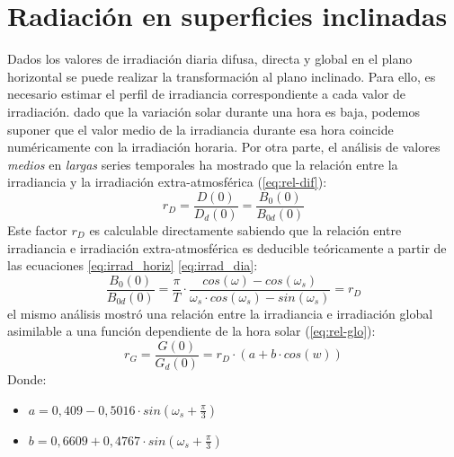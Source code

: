\section{Radiación en superficies inclinadas}
\label{sec:orgcf3b064}
\label{sec:radiacion-superficies-inclinadas}
Dados los valores de irradiación diaria difusa, directa y global en el plano horizontal se puede realizar la transformación al plano inclinado. Para ello, es necesario estimar el perfil de irradiancia correspondiente a cada valor de irradiación. dado que la variación solar durante una hora es baja, podemos suponer que el valor medio de la irradiancia durante esa hora coincide numéricamente con la irradiación horaria. Por otra parte, el análisis de valores \emph{medios}  en \emph{largas} series temporales ha mostrado que la relación entre la irradiancia y la irradiación extra-atmosférica \cite{Collares-Pereira.Rabl1979} (\ref{eq:rel-dif}):
\begin{equation}
r_D=\frac{D(0)}{D_d(0)}=\frac{B_0(0)}{B_{0d}(0)}
\label{eq:rel-dif}
\end{equation}
Este factor \(r_D\) es calculable directamente sabiendo que la relación entre irradiancia e irradiación extra-atmosférica es deducible teóricamente a partir de las ecuaciones \ref{eq:irrad_horiz} \ref{eq:irrad_dia}:
\begin{equation}
\frac{B_0(0)}{B_{0d}(0)}=\frac{\pi}{T}\cdot \frac{cos(\omega)-cos(\omega_s)}{\omega_s\cdot cos(\omega_s)-sin(\omega_s)}=r_D
\label{eq:rel-dif2}
\end{equation}
el mismo análisis mostró una relación entre la irradiancia e irradiación global asimilable a una función dependiente de la hora solar (\ref{eq:rel-glo}):
\begin{equation}
r_G=\frac{G(0)}{G_d(0)}=r_D\cdot(a+b\cdot cos(w))
\label{eq:rel-glo}
\end{equation}
Donde:
\begin{itemize}
\item \(a=0,409-0,5016\cdot sin(\omega_s+\frac{\pi}{3})\)
\item \(b=0,6609+0,4767\cdot sin(\omega_s+\frac{\pi}{3})\)
\end{itemize}

